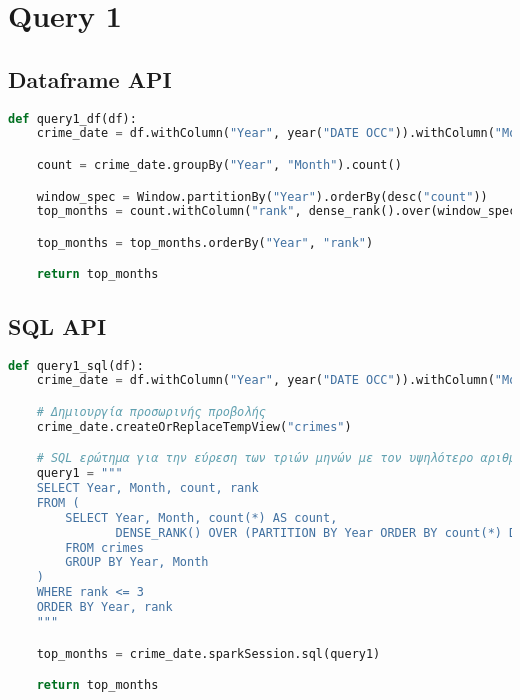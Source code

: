 \documentclass{article}
\begin{document}

\section{Query 1}

\subsection*{Dataframe API}

\begin{lstlisting}[language = Python]
    def query1_df(df):
    crime_date = df.withColumn("Year", year("DATE OCC")).withColumn("Month", month("DATE OCC"))

    count = crime_date.groupBy("Year", "Month").count()

    window_spec = Window.partitionBy("Year").orderBy(desc("count"))
    top_months = count.withColumn("rank", dense_rank().over(window_spec)).filter(col("rank") <= 3)

    top_months = top_months.orderBy("Year", "rank")

    return top_months
\end{lstlisting}  
\subsection*{SQL API}

\begin{lstlisting}[language = Python]
    def query1_sql(df):
    crime_date = df.withColumn("Year", year("DATE OCC")).withColumn("Month", month("DATE OCC"))

    # Δημιουργία προσωρινής προβολής
    crime_date.createOrReplaceTempView("crimes")

    # SQL ερώτημα για την εύρεση των τριών μηνών με τον υψηλότερο αριθμό εγκλημάτων ανά έτος
    query1 = """
    SELECT Year, Month, count, rank 
    FROM (
        SELECT Year, Month, count(*) AS count, 
               DENSE_RANK() OVER (PARTITION BY Year ORDER BY count(*) DESC) AS rank
        FROM crimes
        GROUP BY Year, Month
    ) 
    WHERE rank <= 3
    ORDER BY Year, rank
    """

    top_months = crime_date.sparkSession.sql(query1)

    return top_months

\end{lstlisting}  

\end{document}
